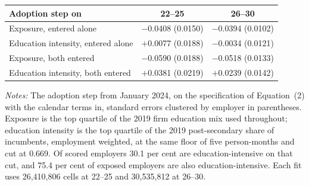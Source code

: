 \begin{tabular}{lcc}
\toprule
Adoption step on & 22--25 & 26--30 \\
\midrule
Exposure, entered alone              & $-$0.0408 (0.0150) & $-$0.0394 (0.0102) \\
Education intensity, entered alone   & $+$0.0077 (0.0188) & $-$0.0034 (0.0121) \\
\addlinespace
Exposure, both entered               & $-$0.0590 (0.0188) & $-$0.0518 (0.0133) \\
Education intensity, both entered    & $+$0.0381 (0.0219) & $+$0.0239 (0.0142) \\
\bottomrule
\end{tabular}

\vspace{0.5em}
\begin{minipage}{0.86\textwidth}
\footnotesize \textit{Notes:} The adoption step from January 2024, on the
specification of Equation~(2) with the calendar terms in, standard errors
clustered by employer in parentheses. Exposure is the top quartile of the 2019
firm education mix used throughout; education intensity is the top quartile of
the 2019 post-secondary share of incumbents, employment weighted, at the same
floor of five person-months and cut at 0.669. Of scored employers 30.1 per cent
are education-intensive on that cut, and 75.4 per cent of exposed employers are
also education-intensive. Each fit uses 26{,}410{,}806 cells at 22--25 and
30{,}535{,}812 at 26--30.
\end{minipage}
